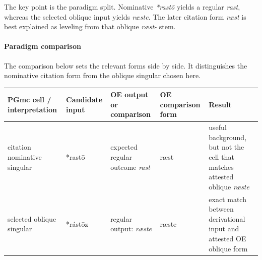 \documentclass[
  british,
  a4paper,
]{article}
\newcounter{none} %
\begin{document}
The key point is the paradigm split. Nominative \emph{*rastō} yields a
regular \emph{rast}, whereas the selected oblique input yields
\emph{ræste}. The later citation form \emph{ræst} is best explained as
leveling from that oblique \emph{ræst-} stem.

\paragraph{Paradigm comparison}\label{paradigm-comparison-13}

The comparison below sets the relevant forms side by side. It
distinguishes the nominative citation form from the oblique singular
chosen here.

{\def\LTcaptype{none} %
\begin{longtable}[]{@{}
  >{\raggedright\arraybackslash}p{}
  >{\raggedright\arraybackslash}p{}
  >{\raggedright\arraybackslash}p{}
  >{\raggedright\arraybackslash}p{}
  >{\raggedright\arraybackslash}p{}@{}}
\toprule\noalign{}
\begin{minipage}[b]{\linewidth}\raggedright
PGmc cell / interpretation
\end{minipage} & \begin{minipage}[b]{\linewidth}\raggedright
Candidate input
\end{minipage} & \begin{minipage}[b]{\linewidth}\raggedright
OE output or comparison
\end{minipage} & \begin{minipage}[b]{\linewidth}\raggedright
OE comparison form
\end{minipage} & \begin{minipage}[b]{\linewidth}\raggedright
Result
\end{minipage} \\
\midrule\noalign{}
\endhead
\bottomrule\noalign{}
\endlastfoot
citation nominative singular & *rastō & expected regular outcome
\emph{rast} & ræst & useful background, but not the cell that matches
attested oblique \emph{ræste} \\
selected oblique singular & *rástōz & regular output: \emph{ræste} &
ræste & exact match between derivational input and attested OE oblique
form \\
\end{longtable}
}
\end{document}
